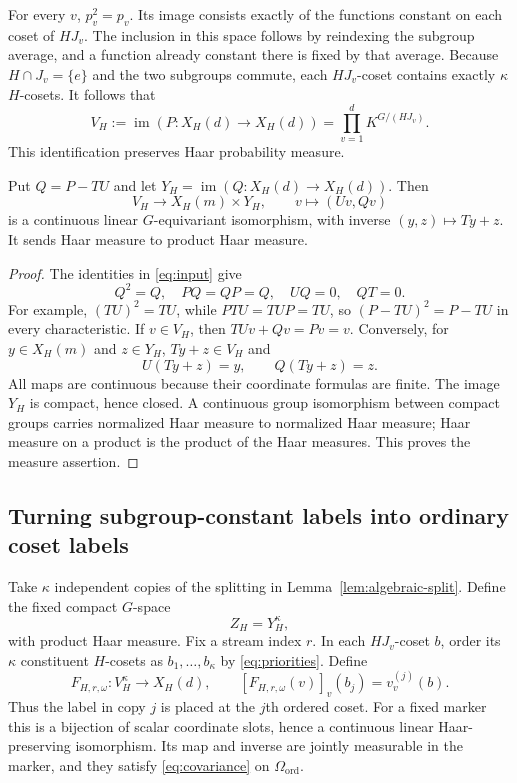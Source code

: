 \documentclass[11pt,a4paper]{article}
\numberwithin{equation}{section}
\DeclareMathOperator{\im}{im}
\begin{document}
For every $v$, $p_v^2=p_v$. Its image consists exactly of the functions
constant on each coset of $HJ_v$. The inclusion in this space follows
by reindexing the subgroup average, and a function already constant
there is fixed by that average. Because $H\cap J_v=\{e\}$ and the two
subgroups commute, each $HJ_v$-coset contains exactly $\kappa$
$H$-cosets. It follows that
\begin{equation}\label{eq:VH}
 V_H:=\im(P:X_H(d)\to X_H(d))
      =\prod_{v=1}^d K^{G/(HJ_v)}.
\end{equation}
This identification preserves Haar probability measure.

\begin{lemma}\label{lem:algebraic-split}
Put $Q=P-TU$ and let $Y_H=\im(Q:X_H(d)\to X_H(d))$. Then
\[
 V_H\longrightarrow X_H(m)\times Y_H,
 \qquad v\longmapsto(Uv,Qv)
\]
is a continuous linear $G$-equivariant isomorphism, with inverse
$(y,z)\mapsto Ty+z$. It sends Haar measure to product Haar measure.
\end{lemma}
\begin{proof}
The identities in \eqref{eq:input} give
\[
 Q^2=Q,\quad PQ=QP=Q,\quad UQ=0,\quad QT=0.
\]
For example, $(TU)^2=TU$, while $PTU=TUP=TU$, so
$(P-TU)^2=P-TU$ in every characteristic.
If $v\in V_H$, then $TUv+Qv=Pv=v$.
Conversely, for $y\in X_H(m)$ and $z\in Y_H$, $Ty+z\in V_H$ and
\[
 U(Ty+z)=y,\qquad Q(Ty+z)=z.
\]
All maps are continuous because their coordinate formulas are finite.
The image $Y_H$ is compact, hence closed. A continuous group isomorphism
between compact groups carries normalized Haar measure to normalized
Haar measure; Haar measure on a product is the product of the Haar
measures. This proves the measure assertion.
\end{proof}

\subsection{Turning subgroup-constant labels into ordinary coset labels}

Take $\kappa$ independent copies of the splitting in
Lemma~\ref{lem:algebraic-split}. Define the fixed compact $G$-space
\[
 Z_H=Y_H^{\kappa},
\]
with product Haar measure. Fix a stream index $r$. In each $HJ_v$-coset
$b$, order its $\kappa$ constituent $H$-cosets as
$b_1,\ldots,b_\kappa$ by \eqref{eq:priorities}. Define
\begin{equation}\label{eq:F}
 F_{H,r,\omega}:V_H^\kappa\longrightarrow X_H(d),
 \qquad [F_{H,r,\omega}(v)]_v(b_j)=v_v^{(j)}(b).
\end{equation}
Thus the label in copy $j$ is placed at the $j$th ordered coset.
For a fixed marker this is a bijection of scalar coordinate slots,
hence a continuous linear Haar-preserving isomorphism. Its map and
inverse are jointly measurable in the marker, and they satisfy
\eqref{eq:covariance} on $\Omega_{\mathrm{ord}}$.
\end{document}
